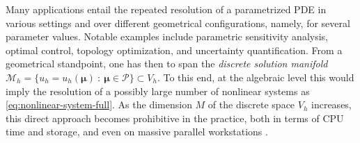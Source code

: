 \documentclass[12pt, a4paper, twoside, openright]{report}
\numberwithin{equation}{chapter}
\theoremstyle{theorem}
\theoremstyle{definition}
\theoremstyle{remark}
\theoremstyle{proposition}
\numberwithin{figure}{chapter}
\begin{document}
		Many applications entail the repeated resolution of a parametrized PDE in various settings and over different geometrical configurations, namely, for several parameter values. Notable examples include parametric sensitivity analysis, optimal control, topology optimization, and uncertainty quantification. From a geometrical standpoint, one has then to span the \emph{discrete solution manifold} $\mathcal{M}_h = \big\lbrace u_h = u_h(\boldsymbol{\mu}) ~ : ~ \boldsymbol{\mu} \in \mathcal{P} \big\rbrace \subset V_h$. To this end, at the algebraic level this would imply the resolution of a possibly large number of nonlinear systems as \eqref{eq:nonlinear-system-full}. As the dimension $M$ of the discrete space $V_h$ increases, this direct approach becomes prohibitive in the practice, both in terms of CPU time and storage, and even on massive parallel workstations \cite{QMN15}. 
		
\end{document}
